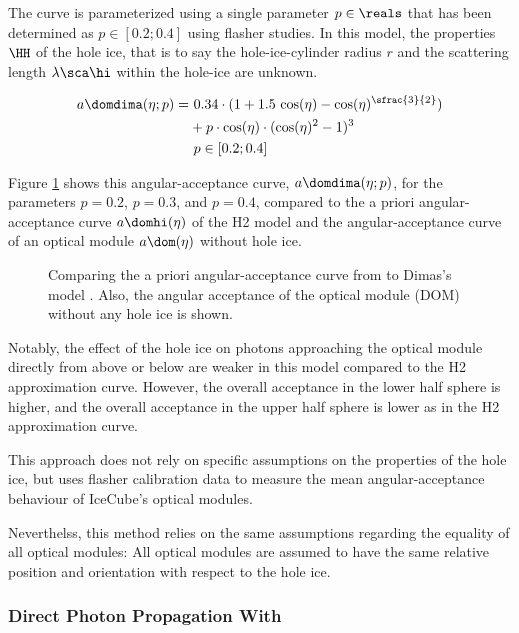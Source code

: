 The curve is parameterized using a single parameter $p\in\reals$ that has been determined as $p \in [0.2;0.4]$ using flasher studies. \cite{msuforwardholeice} In this model, the properties $\HH$ of the hole ice, that is to say the hole-ice-cylinder radius $r$ and the scattering length $\lambda\sca\hi$ within the hole-ice are unknown.

\begin{align}
  a\domdima(\eta;p) = & \ 0.34 \cdot (1 + 1.5\,\cos(\eta) - \cos(\eta)^{\sfrac{3}{2}}) \nonumber \\
      & + p \cdot \cos(\eta) \cdot  (\cos(\eta)^2 - 1)^3 \\
      & \ p \in [0.2;0.4] \nonumber
  \label{eq:adima}
\end{align}

Figure \ref{fig:Vohn9Oov} shows this angular-acceptance curve, $a\domdima(\eta;p)$, for the parameters $p=0.2$, $p=0.3$, and $p=0.4$, compared to the a priori angular-acceptance curve $a\domhi(\eta)$ of the H2 model and the angular-acceptance curve of an optical module $a\dom(\eta)$ without hole ice.

\begin{figure}[htbp]
  \caption{Comparing the a priori angular-acceptance curve from \cite{icepaper} to Dimas's model \cite{flasherdataderivedicemodels}. Also, the angular acceptance of the optical module (DOM) without any hole ice is shown.}
  \label{fig:Vohn9Oov}
\end{figure}

Notably, the effect of the hole ice on photons approaching the optical module directly from above or below are weaker in this model compared to the H2 approximation curve. However, the overall acceptance in the lower half sphere is higher, and the overall acceptance in the upper half sphere is lower as in the H2 approximation curve.

This approach does not rely on specific assumptions on the properties of the hole ice, but uses flasher calibration data to measure the mean angular-acceptance behaviour of IceCube's optical modules.

Neverthelss, this method relies on the same assumptions regarding the equality of all optical modules: All optical modules are assumed to have the same relative position and orientation with respect to the hole ice.


\subsubsection{Direct Photon Propagation With \ppc}
\label{sec:direct_photon_propagation_with_ppc}\label{sec:pocam}

